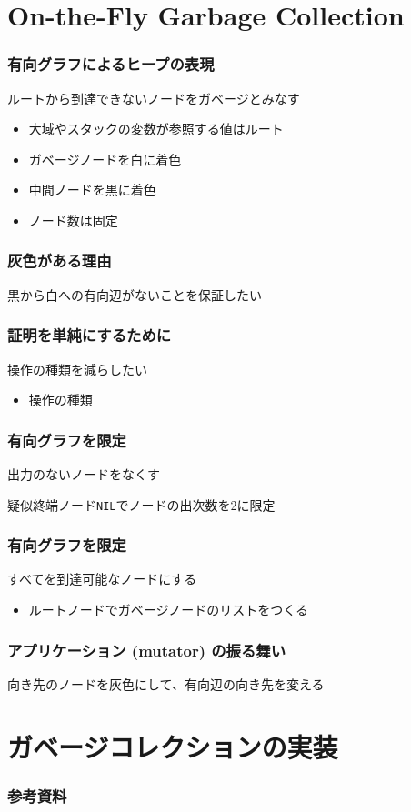 \documentclass[unicode, 14pt, aspectratio=169]{beamer}
\begin{document}
\section{On-the-Fly Garbage Collection}
\begin{frame}
  \frametitle{有向グラフによるヒープの表現}
  {\large ルートから到達できないノードをガベージとみなす}
  \begin{itemize}
  \item 大域やスタックの変数が参照する値はルート
  \item ガベージノードを白に着色
  \item 中間ノードを黒に着色
  \item ノード数は固定
  \end{itemize}
\end{frame}
\begin{frame}
  \frametitle{灰色がある理由}
  {\large 黒から白への有向辺がないことを保証したい}
\end{frame}
\begin{frame}
  \frametitle{証明を単純にするために}
  {\large 操作の種類を減らしたい}
  \begin{itemize}
    \item 操作の種類
  \end{itemize}
\end{frame}
\begin{frame}
  \frametitle{有向グラフを限定}
  {\large 出力のないノードをなくす}
  \par
  疑似終端ノード\texttt{NIL}でノードの出次数を2に限定
\end{frame}
\begin{frame}
  \frametitle{有向グラフを限定}
  {\large すべてを到達可能なノードにする}
  \begin{itemize}
  \item ルートノードでガベージノードのリストをつくる
  \end{itemize}
\end{frame}
\begin{frame}
  \frametitle{アプリケーション (mutator) の振る舞い}
  {\large 向き先のノードを灰色にして、有向辺の向き先を変える}
\end{frame}
\section{ガベージコレクションの実装}
\begin{frame}[allowframebreaks,t]
  \frametitle{参考資料}
  \printbibliography
  \nocite{*}
\end{frame}
\end{document}
